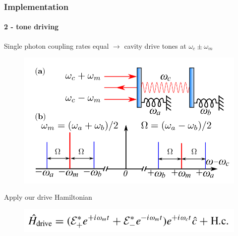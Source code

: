 \documentclass[aspectratio=43]{beamer}
\begin{document}
\begin{frame}

	\frametitle{Implementation}
	\framesubtitle{2 - tone driving}
	
	Single photon coupling rates equal $\longrightarrow$ cavity drive tones at $\omega_{c} \pm \omega_{m}$\\
	
	\begin{figure}
		\includegraphics[width = 7 cm]{plots/plot_2_tone.png}
	\end{figure}	

	Apply our drive Hamiltonian

	\begin{figure}
		\includegraphics[width = 7 cm]{plots/hamiltonian_2_tone.png}
	\end{figure}

\end{frame}
\end{document}
